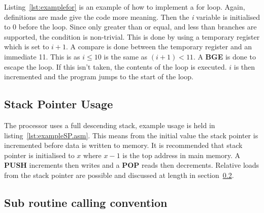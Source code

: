 \begin{minipage}{\linewidth}

\end{minipage}

Listing~\ref{lst:examplefor} is an example of how to implement a for loop. 
Again, definitions are made give the code more meaning. 
Then the \textit{i} variable is initialised to 0 before the loop. 
Since only greater than or equal, and less than branches are supported, the condition is non-trivial.
This is done by using a temporary register which is set to $i + 1$. 
A compare is done between the temporary register and an immediate 11.
This is as $i \leq 10$ is the same as $(i+1) < 11$. 
A \textbf{BGE} is done to escape the loop. 
If this isn't taken, the contents of the loop is executed.
$i$ is then incremented and the program jumps to the start of the loop. 


\begin{minipage}{\linewidth}

\end{minipage}

\subsection{Stack Pointer Usage}

The \samurai{} processor uses a full descending stack, example usage is held in listing~\ref{lst:exampleSP.asm}.
This means from the initial value the stack pointer is incremented before data is written to memory.
It is recommended that stack pointer is initialised to $x$ where $x-1$ is the top address in main memory. 
A \textbf{PUSH} increments then writes and a \textbf{POP} reads then decrements.
Relative loads from the stack pointer are possible and discussed at length in section~\ref{sec:subroutine_calls}.

\begin{minipage}{\linewidth}

\end{minipage}

\subsection{Sub routine calling convention}
\label{sec:subroutine_calls}

